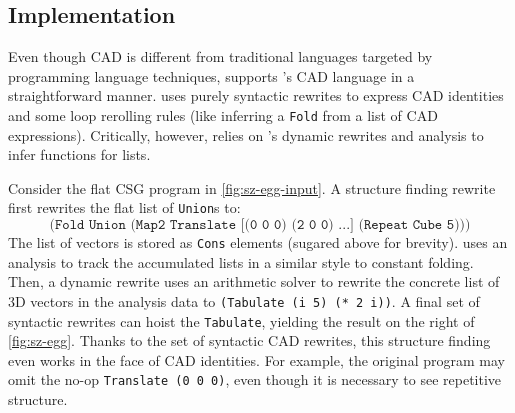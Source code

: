 \subsection{Implementation}

Even though CAD is
  different from traditional languages
  targeted by programming language techniques,
  \egg supports \sz's CAD language in a straightforward manner.
\sz uses purely syntactic rewrites to express
  CAD identities and some loop rerolling rules
  (like inferring a \texttt{Fold} from a list of CAD expressions).
Critically, however, \sz relies on \egg's
  dynamic rewrites and \eclass analysis to infer functions
  for lists.

Consider the flat CSG program in \autoref{fig:sz-egg-input}.
A structure finding rewrite first rewrites the flat list of \texttt{Union}s to:
$$\texttt{(Fold Union (Map2 Translate [(0 0 0) (2 0 0) ...] (Repeat Cube 5)))}$$
The list of vectors is stored as \texttt{Cons} elements (sugared above for brevity).
\sz uses an \eclass analysis to track the accumulated lists in a similar style
  to constant folding.
Then, a dynamic rewrite uses an arithmetic solver to rewrite the concrete
  list of 3D vectors in the analysis data
  to \mbox{\texttt{(Tabulate (i 5) (* 2 i))}}.
A final set of syntactic rewrites can hoist the \texttt{Tabulate}, yielding the
  result on the right of \autoref{fig:sz-egg}.
Thanks to the set of syntactic CAD rewrites, this structure finding even works
  in the face of CAD identities.
For example, the original program may omit the no-op
  \texttt{Translate (0 0 0)}, even though it is necessary to see repetitive
  structure.

